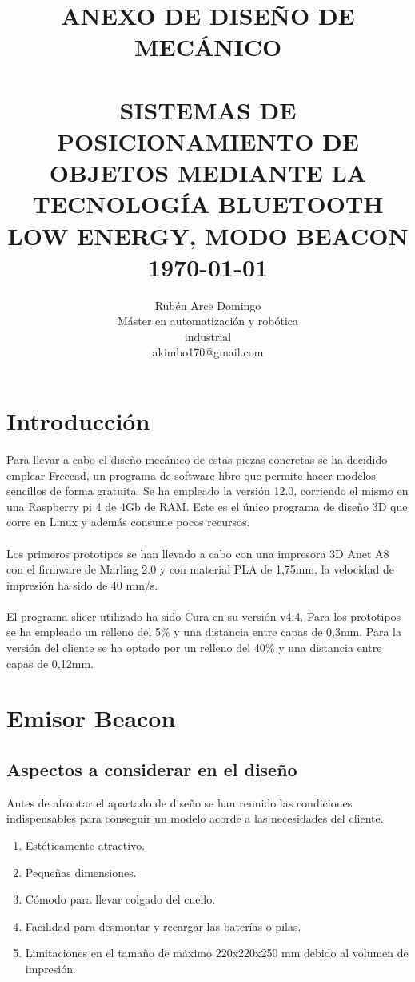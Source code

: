\documentclass[paper=a4, fontsize=11pt,twoside]{scrartcl}
\title{	\normalsize \textsc{ANEXO DE DISEÑO DE MECÁNICO} 	%
		 	\\[2.0cm]								%
			\HRule{0.5pt} \\						%
			\LARGE \textbf{\uppercase{Sistemas de posicionamiento de objetos mediante la tecnología Bluetooth Low Energy, modo Beacon}}	%
			\HRule{2pt} \\ [0.5cm]		%
			\normalsize \today			%
		}
\author{
		Rubén Arce Domingo\\	
		Máster en automatización y robótica\\	
		industrial\\
		akimbo170@gmail.com\\
}
\makeatletter
\def\printtitle{%
    {\centering \@title\par}}
\def\printauthor{%
    {\centering \large \@author}}
\makeatother
\begin{document}
\thispagestyle{empty}		%
\printtitle					%
  	\vfill
\printauthor				%
\newpage
\cleardoublepage
\tableofcontents
\listoffigures
\cleardoublepage
\pagestyle{fancy}
\section{Introducción}
    Para llevar a cabo el diseño mecánico de estas piezas concretas se ha decidido emplear Freecad, un
    programa de software libre que permite hacer modelos sencillos de forma gratuita.
    Se ha empleado la versión 12.0, corriendo el mismo en una Raspberry pi 4 de 4Gb de RAM. Este es el único
    programa de diseño 3D que corre en Linux y además consume pocos recursos.
    \paragraph{}
    Los primeros prototipos se han llevado a cabo con una impresora 3D Anet A8 con el firmware de Marling
    2.0 y con material PLA de 1,75mm, la velocidad de impresión ha sido de 40 mm/s.
    \paragraph{}
    El programa slicer utilizado ha sido Cura en su versión v4.4. Para los prototipos se ha empleado un relleno del 5\% y una distancia
    entre capas de 0,3mm. Para la versión del cliente se ha optado por un relleno del 40\% y una distancia entre capas de 0,12mm.
\section{Emisor Beacon}
    \subsection{Aspectos a considerar en el diseño}
        Antes de afrontar el apartado de diseño se han reunido las condiciones indispensables para 
        conseguir un modelo acorde a las necesidades del cliente.
        \begin{enumerate}
            \item Estéticamente atractivo.
            \item Pequeñas dimensiones.
            \item Cómodo para llevar colgado del cuello.
            \item Facilidad para desmontar y recargar las baterías o pilas.
            \item Limitaciones en el tamaño de máximo 220x220x250 mm debido al volumen de impresión.
        \end{enumerate}
\end{document}
